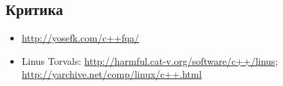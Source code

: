\chapter{\CPP}





\section{Критика}

\begin{itemize}

\item
\url{http://yosefk.com/c++fqa/}

\item
Linus Torvals: \url{http://harmful.cat-v.org/software/c++/linus}; \url{http://yarchive.net/comp/linux/c++.html}

\end{itemize}


